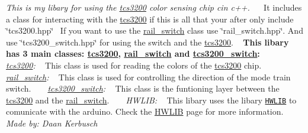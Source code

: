 {\itshape This is my libary for using the \hyperlink{classtcs3200}{tcs3200} color sensing chip cin c++.}~\newline
~\newline
It includes a class for interacting with the \hyperlink{classtcs3200}{tcs3200} if this is all that your after only include \char`\"{}tcs3200.\+hpp\char`\"{}~\newline
If you want to use the \hyperlink{classrail__switch}{rail\+\_\+switch} class use \char`\"{}rail\+\_\+switch.\+hpp\char`\"{}. And use \char`\"{}tcs3200\+\_\+switch.\+hpp\char`\"{} for using the switch and the \hyperlink{classtcs3200}{tcs3200}. ~\newline
{\bfseries This libary has 3 main classes\+: \hyperlink{classtcs3200}{tcs3200}, \hyperlink{classrail__switch}{rail\+\_\+switch} and \hyperlink{classtcs3200__switch}{tcs3200\+\_\+switch}\+:} ~\newline
~\newline
{\itshape \hyperlink{classtcs3200}{tcs3200}\+:} ~\newline
This class is used for reading the colors of the \hyperlink{classtcs3200}{tcs3200} chip. ~\newline
~\newline
{\itshape \hyperlink{classrail__switch}{rail\+\_\+switch}\+:} ~\newline
This class is used for controlling the direction of the mode train switch. ~\newline
~\newline
{\itshape \hyperlink{classtcs3200__switch}{tcs3200\+\_\+switch}\+:} ~\newline
This class is the funtioning layer between the \hyperlink{classtcs3200}{tcs3200} and the \hyperlink{classrail__switch}{rail\+\_\+switch}. ~\newline
~\newline
{\itshape H\+W\+L\+IB\+:} ~\newline
This libary uses the libary \href{https://github.com/wovo/hwlib}{\tt H\+W\+L\+IB} to comunicate with the arduino. Check the \hyperlink{HWLIB}{H\+W\+L\+IB} page for more information. ~\newline
~\newline
{\itshape Made by\+: Daan Kerbusch}~\newline
